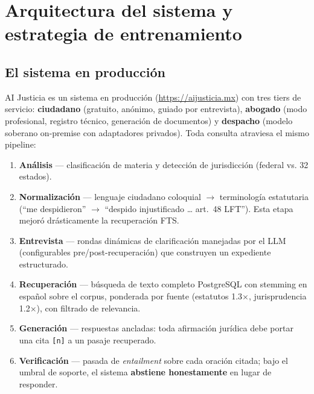 \section{Arquitectura del sistema y estrategia de entrenamiento}\label{sec:entrenamiento}

\subsection{El sistema en producción}

AI Justicia es un sistema en producción (\url{https://aijusticia.mx}) con tres tiers de servicio: \textbf{ciudadano} (gratuito, anónimo, guiado por entrevista), \textbf{abogado} (modo profesional, registro técnico, generación de documentos) y \textbf{despacho} (modelo soberano on-premise con adaptadores privados). Toda consulta atraviesa el mismo pipeline:

\begin{enumerate}
\item \textbf{Análisis} --- clasificación de materia y detección de jurisdicción (federal vs. 32 estados).
\item \textbf{Normalización} --- lenguaje ciudadano coloquial $\rightarrow$ terminología estatutaria (``me despidieron'' $\rightarrow$ ``despido injustificado \dots{} art.~48 LFT''). Esta etapa mejoró drásticamente la recuperación FTS.
\item \textbf{Entrevista} --- rondas dinámicas de clarificación manejadas por el LLM (configurables pre/post-recuperación) que construyen un expediente estructurado.
\item \textbf{Recuperación} --- búsqueda de texto completo PostgreSQL con stemming en español sobre el corpus, ponderada por fuente (estatutos 1.3$\times$, jurisprudencia 1.2$\times$), con filtrado de relevancia.
\item \textbf{Generación} --- respuestas ancladas: toda afirmación jurídica debe portar una cita \texttt{[n]} a un pasaje recuperado.
\item \textbf{Verificación} --- pasada de \emph{entailment} sobre cada oración citada; bajo el umbral de soporte, el sistema \textbf{abstiene honestamente} en lugar de responder.
\end{enumerate}

